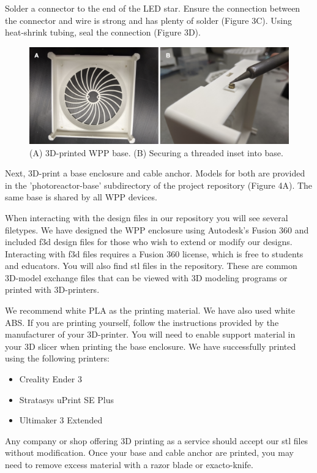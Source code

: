 \documentclass[11pt]{article}
\begin{document}
Solder a connector to the end of the LED star.
Ensure the connection between the connector and wire is strong and has plenty of solder (Figure 3C).
Using heat-shrink tubing, seal the connection (Figure 3D).

\begin{figure}[H]
	\includegraphics[width=\textwidth]{"./fig4.png"}
	\caption{(A) 3D-printed WPP base. (B) Securing a threaded inset into base.}
\end{figure}

Next, 3D-print a base enclosure and cable anchor.
Models for both are provided in the 'photoreactor-base' subdirectory of the project repository (Figure 4A).
The same base is shared by all WPP devices.

When interacting with the design files in our repository you will see several filetypes.
We have designed the WPP enclosure using Autodesk's Fusion 360 and included f3d design files for those who wish to extend or modify our designs.
Interacting with f3d files requires a Fusion 360 license, which is free to students and educators.
You will also find stl files in the repository.
These are common 3D-model exchange files that can be viewed with 3D modeling programs or printed with 3D-printers.

We recommend white PLA as the printing material. We have also used white ABS.
If you are printing yourself, follow the instructions provided by the manufacturer of your 3D-printer.
You will need to enable support material in your 3D slicer when printing the base enclosure.
We have successfully printed using the following printers:

\begin{itemize}
	\item Creality Ender 3
	\item Stratasys uPrint SE Plus
	\item Ultimaker 3 Extended
\end{itemize}

Any company or shop offering 3D printing as a service should accept our stl files without modification.
Once your base and cable anchor are printed, you may need to remove excess material with a razor blade or exacto-knife.
\end{document}
